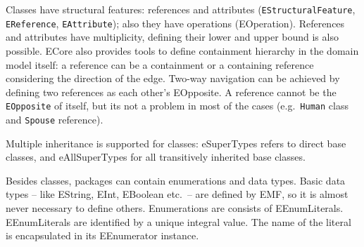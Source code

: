 Classes have structural features: references and attributes (\texttt{EStructuralFeature}, \texttt{EReference}, \texttt{EAttribute}); also they have operations (EOperation).
References and attributes have multiplicity, defining their lower and upper bound is also possible.
ECore also provides tools to define containment hierarchy in the domain model itself: a reference can be a containment or a containing reference considering the direction of the edge. 
Two-way navigation can be achieved by defining two references as each other's EOpposite. A reference cannot be the \texttt{EOpposite} of itself, but its not a problem in most of the cases (e.g.\ \texttt{Human} class and \texttt{Spouse} reference). 

Multiple inheritance is supported for classes: eSuperTypes refers to direct base classes, and eAllSuperTypes for all transitively inherited base classes.

Besides classes, packages can contain enumerations and data types. 
Basic data types -- like EString, EInt, EBoolean etc.\ -- are defined by EMF, so it is almost never necessary to define others.
Enumerations are consists of EEnumLiterals. 
EEnumLiterals are identified by a unique integral value.
The name of the literal is encapsulated in its EEnumerator instance.


